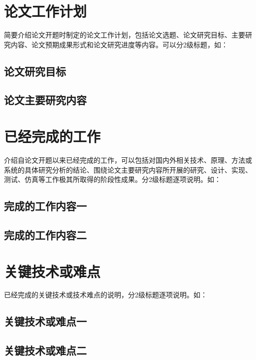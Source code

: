 \documentclass{buaa-midterm}
\begin{document}
\MakeReportCover
\tableofcontents
\MakeReportTitle

\section{论文工作计划}

简要介绍论文开题时制定的论文工作计划，包括论文选题、论文研究目标、主要研究内容、论文预期成果形式和论文研究进度等内容。可以分2级标题，如：

\subsection{论文研究目标}

\subsection{论文主要研究内容}

\section{已经完成的工作}

介绍自论文开题以来已经完成的工作，可以包括对国内外相关技术、原理、方法或系统的具体研究分析的结论、围绕论文主要研究内容所开展的研究、设计、实现、测试、仿真等工作极其所取得的阶段性成果。分2级标题逐项说明。如：

\subsection{完成的工作内容一}

\subsection{完成的工作内容二}

\section{关键技术或难点}

已经完成的关键技术或技术难点的说明，分2级标题逐项说明。如：

\subsection{关键技术或难点一}

\newpage

\subsection{关键技术或难点二}
\end{document}
